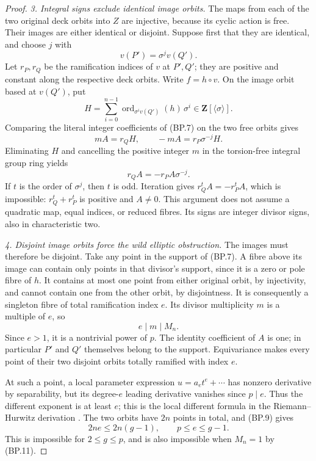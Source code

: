 \documentclass[11pt,a4paper]{article}
\begin{document}
\begin{proof}
\emph{3. Integral signs exclude identical image orbits.}
The maps from each of the two original deck orbits into $Z$
are injective, because its cyclic action is free. Their images
are either identical or disjoint.
Suppose first that they are identical, and choose $j$ with
\[
                         v(P')=\sigma^jv(Q').
\]
Let $r_P,r_Q$ be the ramification indices of $v$ at $P',Q'$;
they are positive and constant along the respective deck orbits.
Write $f=h\circ v$. On the image orbit based at $v(Q')$, put
\[
 H=\sum_{i=0}^{n-1}
       \operatorname{ord}_{\sigma^iv(Q')}(h)\,\sigma^i
                         \in\mathbf Z[\langle\sigma\rangle].
\]
Comparing the literal integer coefficients of (BP.7) on the
two free orbits gives
\[
           mA=r_QH,\qquad -mA=r_P\sigma^{-j}H.
\]
Eliminating $H$ and cancelling the positive integer $m$ in
the torsion-free integral group ring yields
\[
                        r_QA=-r_PA\sigma^{-j}.
 \tag{BP.10}
\]
If $t$ is the order of $\sigma^j$, then $t$ is odd. Iteration
gives $r_Q^tA=-r_P^tA$, which is impossible: $r_Q^t+r_P^t$
is positive and $A\ne0$. This argument does not assume a
quadratic map, equal indices, or reduced fibres. Its signs
are integer divisor signs, also in characteristic two.

\emph{4. Disjoint image orbits force the wild elliptic obstruction.}
The images must therefore be disjoint. Take any point in the
support of (BP.7). A fibre above its image can contain only
points in that divisor's support, since it is a zero or pole
fibre of $h$. It contains at most one point from either original
orbit, by injectivity, and cannot contain one from the other
orbit, by disjointness. It is consequently a singleton fibre
of total ramification index $e$. Its divisor multiplicity
$m$ is a multiple of $e$, so
\[
                         e\mid m\mid M_n.
 \tag{BP.11}
\]
Since $e>1$, it is a nontrivial power of $p$.
The identity coefficient of $A$ is one; in particular $P'$
and $Q'$ themselves belong to the support. Equivariance makes
every point of their two disjoint orbits totally ramified
with index $e$.

At such a point, a local parameter expression
$u=a_et^e+\cdots$ has nonzero derivative by separability,
but its degree-$e$ leading derivative vanishes since $p\mid e$.
Thus the different exponent is at least $e$; this is the local
different formula in the Riemann--Hurwitz derivation
\cite[Lemma~53.12.4, Tag~\texttt{0C1F}]{StacksRH}.
The two orbits have $2n$ points in total, and (BP.9) gives
\[
                         2ne\le2n(g-1),
                    \qquad p\le e\le g-1.
 \tag{BP.12}
\]
This is impossible for $2\le g\le p$, and is also impossible
when $M_n=1$ by (BP.11).


\end{proof}
\end{document}
